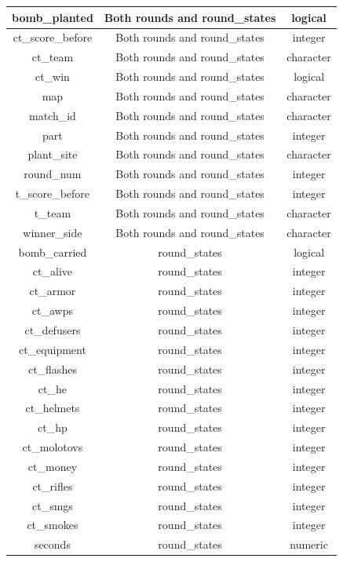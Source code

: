 \documentclass[twoside,11pt]{article}
\begin{document}
\begin{longtable}[c]{| c | c | c |}
  bomb\_planted & Both rounds and round\_states & logical \\\hline
  ct\_score\_before & Both rounds and round\_states & integer\\\hline
  ct\_team & Both rounds and round\_states & character\\\hline
  ct\_win & Both rounds and round\_states & logical\\\hline
  map & Both rounds and round\_states & character\\\hline
  match\_id & Both rounds and round\_states & character\\\hline
  part & Both rounds and round\_states & integer\\\hline
  plant\_site & Both rounds and round\_states & character\\\hline
  round\_num & Both rounds and round\_states & integer\\\hline
  t\_score\_before & Both rounds and round\_states & integer\\\hline
  t\_team & Both rounds and round\_states & character\\\hline
  winner\_side & Both rounds and round\_states & character\\\hline
  bomb\_carried & round\_states & logical\\\hline
  ct\_alive & round\_states & integer\\\hline
  ct\_armor & round\_states & integer\\\hline
  ct\_awps & round\_states & integer\\\hline
  ct\_defusers & round\_states & integer\\\hline
  ct\_equipment & round\_states & integer\\\hline
  ct\_flashes & round\_states & integer\\\hline
  ct\_he & round\_states & integer\\\hline
  ct\_helmets & round\_states & integer\\\hline
  ct\_hp & round\_states & integer\\\hline
  ct\_molotovs & round\_states & integer\\\hline
  ct\_money & round\_states & integer\\\hline
  ct\_rifles & round\_states & integer\\\hline
  ct\_smgs & round\_states & integer\\\hline
  ct\_smokes & round\_states & integer\\\hline
  seconds & round\_states & numeric\\\hline

\end{longtable}
\end{document}
